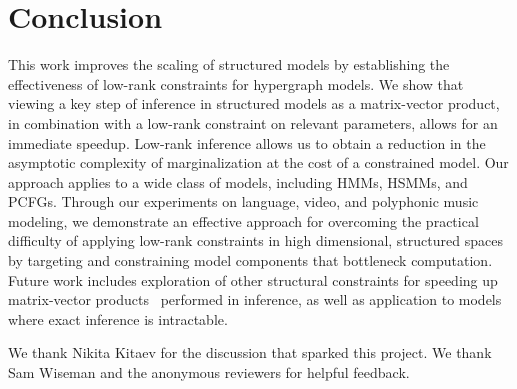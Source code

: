 \documentclass{article}
\begin{document}


\section{Conclusion}

This work improves the scaling of structured models by establishing the effectiveness of low-rank constraints for hypergraph models. We show that viewing a key step of inference in structured models as a matrix-vector product, in combination with a low-rank constraint on relevant parameters, allows for an immediate speedup. 
Low-rank inference allows us to obtain a reduction in the asymptotic complexity of marginalization at the cost of 
a constrained model. 
Our approach applies to a wide class of models, including HMMs, HSMMs, and PCFGs. Through our experiments on language, video, and polyphonic music modeling, we demonstrate an effective approach for overcoming the practical difficulty of applying low-rank constraints in high dimensional, structured spaces by targeting and constraining model components that bottleneck computation. Future work includes exploration of other structural constraints for speeding up matrix-vector products~\citep{kaleidoscope} performed in inference, as well as application to models where exact inference is intractable.

\begin{ack}
We thank Nikita Kitaev for the discussion that sparked this project.
We thank Sam Wiseman and the anonymous reviewers for helpful feedback.
\end{ack}





\end{document}
